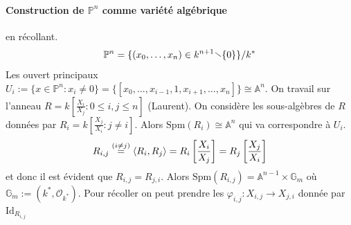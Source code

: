\paragraph{Construction de \(\mathbb{P}^{n}\) comme variété algébrique} en
récollant.
\[
  \mathbb{P}^{n} = \{{(x_{0}, \dots, x_{n})} \in  k^{n+1} \sminus \{0\} \} /
  k^{*}
\]
Les ouvert principaux \(U_{i} := \{x \in \mathbb{P}^{n} : x_{i} \neq 0\} =
\{[x_{0}, \dots, x_{i-1} , 1, x_{i+1} , \dots, x_{n}]\} \cong \mathbb{A} ^{n}
\). On travail sur l'anneau \(R = k \left[ \frac{X_{i}}{X_{j}} : 0 \le i, j \le
n\right] \) (Laurent). On considère les sous-algèbres de \(R\) données par
\(R_{i} = k \left[ \frac{X_{j}}{X_{i}} : j \neq i \right] \). Alors
\(\mathrm{Spm}{(R_{i})} \cong \mathbb{A}^{n}\) qui va correspondre à \(U_{i}\). 
\[
  R_{i,j} \overset{{(i \neq j)}}{=} {\left\langle R_{i}, R_{j}\right\rangle} = R_{i} \left[
  \frac{X_{i}}{X_{j}} \right] = R_{j} \left[ \frac{X_{j}}{X_{i}} \right]
\]
et donc il est évident que \(R_{i,j} = R_{j, i} \).
Alors \(\mathrm{Spm}{(R_{i,j} )} = \mathbb{A}^{n-1} \times \mathbb{G}_m\) où
\(\mathbb{G}_m := {(k^{*}, \mathcal{O}_{k^{*}} )}\). Pour récoller on peut
prendre les \(\varphi_{i,j} : X_{i,j} \to X_{j,i} \) donnée par
\(\mathrm{Id}_{R_{i,j} } \) 


